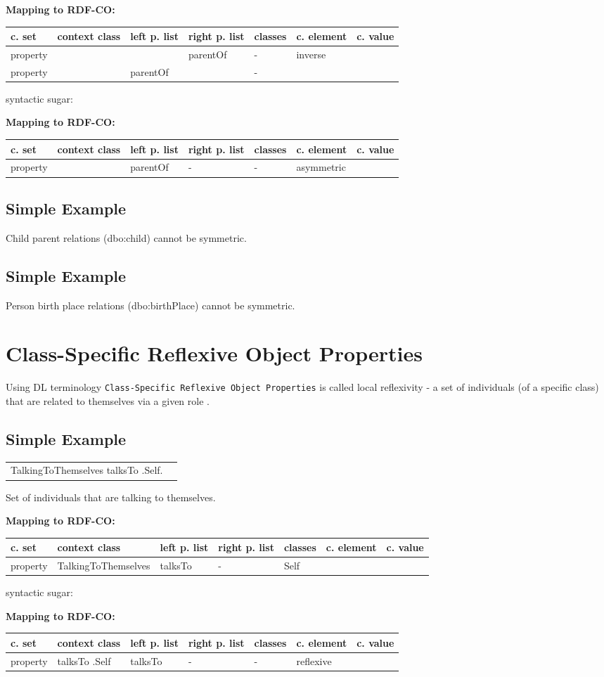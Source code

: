 \documentclass{llncs}
\newcommand{\ms}[1]{\texttt{#1}}
\newenvironment{gcotable}{
  \scriptsize
  \sffamily
  \vspace{0cm}
	\begin{center}
	\textbf{\vspace{0.4cm}Mapping to RDF-CO:} \\
  \begin{tabular}{l|l|l|l|l|l|l}
	\hline
  \textbf{c. set} & \textbf{context class} & \textbf{left p. list} & \textbf{right p. list} & \textbf{classes} & \textbf{c. element} & \textbf{c. value} \\
  \hline

}{
  \hline
  \end{tabular}
	\end{center}
}
\newenvironment{DL}{
\vspace{0cm}
	\begin{center}
  \begin{tabular}{r l}

}{
  \end{tabular}
	\end{center}
}
\begin{document}
\begin{gcotable}
property &  &  & parentOf & - & inverse \\
property &  & parentOf &  & - &  \\
\end{gcotable}

syntactic sugar:

\begin{gcotable}
property &  & parentOf & - & - & asymmetric \\
\end{gcotable}

\subsection{Simple Example}

Child parent relations (dbo:child) cannot be symmetric.

\subsection{Simple Example}

Person birth place relations (dbo:birthPlace) cannot be symmetric.

\section{Class-Specific Reflexive Object Properties}

Using DL terminology \ms{Class-Specific Reflexive Object Properties} is called local reflexivity - a set of individuals (of a specific class) that are related to themselves via a given role \cite{Kroetzsch2012}.

\subsection{Simple Example}

\begin{DL}
TalkingToThemselves   talksTo .Self. 
\end{DL}

Set of individuals that are talking to themselves.

\begin{gcotable}
property & TalkingToThemselves & talksTo & - & Self &  \\
\end{gcotable}

syntactic sugar:

\begin{gcotable}
property &  talksTo .Self & talksTo & - & - & reflexive \\
\end{gcotable}
\end{document}
